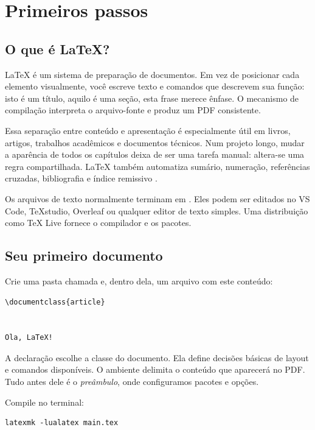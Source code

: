 \chapter{Primeiros passos}
\label{chap:primeiros-passos}

\section{O que é LaTeX?}

LaTeX é um sistema de preparação de documentos. Em vez de posicionar cada
elemento visualmente, você escreve texto e comandos que descrevem sua função:
isto é um título, aquilo é uma seção, esta frase merece ênfase. O mecanismo de
compilação interpreta o arquivo-fonte e produz um PDF consistente.

Essa separação entre conteúdo e apresentação é especialmente útil em livros,
artigos, trabalhos acadêmicos e documentos técnicos. Num projeto longo, mudar a
aparência de todos os capítulos deixa de ser uma tarefa manual: altera-se uma
regra compartilhada. LaTeX também automatiza sumário, numeração, referências
cruzadas, bibliografia e índice remissivo \citep{lamport1994}.

Os arquivos de texto normalmente terminam em . Eles podem ser
editados no VS Code, TeXstudio, Overleaf ou qualquer editor de texto simples.
Uma distribuição como TeX Live fornece o compilador e os pacotes.

\section{Seu primeiro documento}

Crie uma pasta chamada  e, dentro dela, um arquivo
 com este conteúdo:

\begin{lstlisting}[language=LaTeXBook]
\documentclass{article}


Ola, LaTeX!

\end{lstlisting}

A declaração  escolhe a classe do documento.
Ela define decisões básicas de layout e comandos disponíveis. O ambiente
 delimita o conteúdo que aparecerá no PDF. Tudo antes dele é
o \emph{preâmbulo}, onde configuramos pacotes e opções.

Compile no terminal:

\begin{lstlisting}
latexmk -lualatex main.tex
\end{lstlisting}

